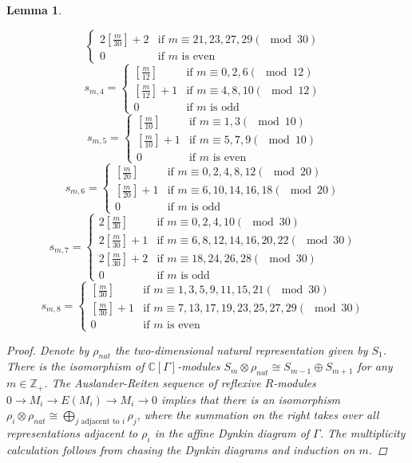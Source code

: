\documentclass{amsart}[12pt]
\newtheorem{lemma}[theorem]{Lemma}
\theoremstyle{definition}
\theoremstyle{remark}
\numberwithin{equation}{section}
\begin{document}
\begin{lemma}
\begin{enumerate}
\[\begin{cases}
2[\frac{m}{30}] + 2 & \textrm{if $m \equiv 21, 23, 27, 29 (\mod 30)$ } \\
0 & \textrm{if $m$ is even}
\end{cases}
\]
\[
s_{m, 4}  = \begin{cases} 
[\frac{m}{12}] & \textrm{if $m \equiv 0, 2, 6 (\mod 12)$ } \\
[\frac{m}{12}] + 1 & \textrm{if $m \equiv 4, 8, 10 (\mod 12)$ } \\
0 & \textrm{if $m$ is odd}
\end{cases}
\]
\[
s_{m, 5}  = \begin{cases} 
[\frac{m}{10}] & \textrm{if $m \equiv 1, 3 (\mod 10)$ } \\
[\frac{m}{10}] + 1 & \textrm{if $m \equiv 5, 7, 9 (\mod 10)$ } \\
0 & \textrm{if $m$ is even}
\end{cases}
\]
\[
s_{m, 6}  = \begin{cases} 
[\frac{m}{20}] & \textrm{if $m \equiv 0, 2, 4, 8, 12 (\mod 20)$ } \\
[\frac{m}{20}] + 1 & \textrm{if $m \equiv 6, 10, 14, 16, 18 (\mod 20)$ } \\
0 & \textrm{if $m$ is odd}
\end{cases} 
\]
\[
s_{m, 7} = \begin{cases} 
2[\frac{m}{30}] & \textrm{if $m \equiv 0, 2, 4, 10 (\mod 30)$ } \\
2[\frac{m}{30}] + 1 & \textrm{if $m \equiv 6, 8, 12, 14, 16, 20, 22 (\mod 30)$ } \\
2[{\frac{m}{30}}] + 2 & \textrm{if $m \equiv 18, 24, 26, 28 (\mod 30)$ } \\
0 & \textrm{if $m$ is odd}
\end{cases} 
\]
\[
s_{m, 8}  = \begin{cases} 
[\frac{m}{30}] & \textrm{if $m \equiv 1, 3, 5, 9, 11, 15, 21 (\mod 30)$ } \\
[\frac{m}{30}] + 1 & \textrm{if $m \equiv 7, 13, 17, 19, 23, 25, 27, 29 (\mod 30)$ } \\
0 & \textrm{if $m$ is even}
\end{cases}
\]
\end{enumerate}
\begin{proof}
Denote by $\rho_{nat}$ the two-dimensional natural representation given by $S_1$. There is the isomorphism of $\mathbb{C}[\Gamma]$-modules $S_m \otimes \rho_{nat} \cong S_{m - 1} \oplus S_{m + 1}$ for any $m \in \mathbb{Z}_+$. The Auslander-Reiten sequence of reflexive $R$-modules $0 \to M_i \to E(M_i) \to M_i \to 0$
implies that there is an isomorphism $\rho_i \otimes \rho_{nat} \cong \bigoplus_{j \textrm{ adjacent to }i} \rho_j$, where the summation on the right takes over all representations adjacent to $\rho_i$ in the affine Dynkin diagram of $\Gamma$. The multiplicity calculation follows from chasing the Dynkin diagrams and induction on $m$. 
\end{proof}
\end{lemma}
\end{document}
